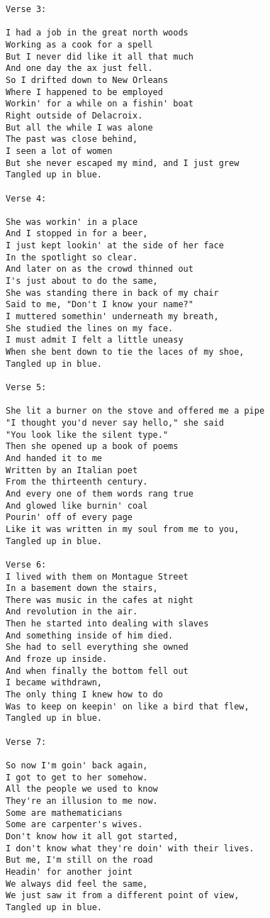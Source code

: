 \documentclass[leqno]{memoir}
\begin{document}
\begin{verbatim}
Verse 3:

I had a job in the great north woods
Working as a cook for a spell
But I never did like it all that much
And one day the ax just fell.
So I drifted down to New Orleans
Where I happened to be employed
Workin' for a while on a fishin' boat
Right outside of Delacroix.
But all the while I was alone
The past was close behind,
I seen a lot of women
But she never escaped my mind, and I just grew
Tangled up in blue.

Verse 4:

She was workin' in a place
And I stopped in for a beer,
I just kept lookin' at the side of her face
In the spotlight so clear.
And later on as the crowd thinned out
I's just about to do the same,
She was standing there in back of my chair
Said to me, "Don't I know your name?"
I muttered somethin' underneath my breath,
She studied the lines on my face.
I must admit I felt a little uneasy
When she bent down to tie the laces of my shoe,
Tangled up in blue.

Verse 5:

She lit a burner on the stove and offered me a pipe
"I thought you'd never say hello," she said
"You look like the silent type."
Then she opened up a book of poems
And handed it to me
Written by an Italian poet
From the thirteenth century.
And every one of them words rang true
And glowed like burnin' coal
Pourin' off of every page
Like it was written in my soul from me to you,
Tangled up in blue.

Verse 6:
I lived with them on Montague Street
In a basement down the stairs,
There was music in the cafes at night
And revolution in the air.
Then he started into dealing with slaves
And something inside of him died.
She had to sell everything she owned
And froze up inside.
And when finally the bottom fell out
I became withdrawn,
The only thing I knew how to do
Was to keep on keepin' on like a bird that flew,
Tangled up in blue.

Verse 7:

So now I'm goin' back again,
I got to get to her somehow.
All the people we used to know
They're an illusion to me now.
Some are mathematicians
Some are carpenter's wives.
Don't know how it all got started,
I don't know what they're doin' with their lives.
But me, I'm still on the road
Headin' for another joint
We always did feel the same,
We just saw it from a different point of view,
Tangled up in blue.
\end{verbatim}
\newpage
\end{document}
